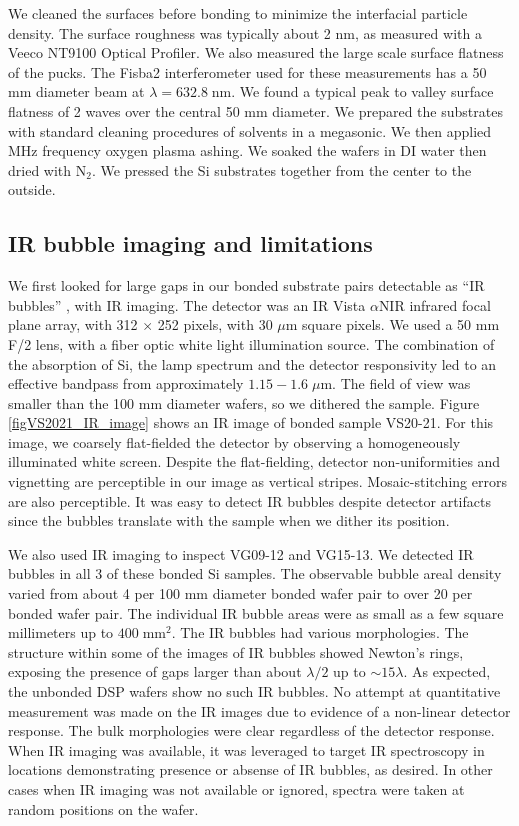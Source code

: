 

We cleaned the surfaces before bonding to minimize the interfacial particle density.  The surface roughness was typically about 2 nm, as measured with a Veeco NT9100 Optical Profiler.  We also measured the large scale surface flatness of the pucks.  The Fisba2 interferometer used for these measurements has a 50 mm diameter beam at $\lambda=632.8\;$nm.  We found a typical peak to valley surface flatness of 2 waves over the central 50 mm diameter.  We prepared the substrates with standard cleaning procedures of solvents in a megasonic.  We then applied MHz frequency oxygen plasma ashing.  We soaked the wafers in DI water then dried with N$_2$.  We pressed the Si substrates together from the center to the outside.

\subsection{IR bubble imaging and limitations}

We first looked for large gaps in our bonded substrate pairs detectable as ``IR bubbles'' \cite{1992JEMat..21..669M}, with IR imaging.  The detector was an IR Vista $\alpha$NIR infrared focal plane array, with 312 $\times$ 252 pixels, with 30 $\mu$m square pixels.  We used a 50 mm F/2 lens, with a fiber optic white light illumination source.  The combination of the absorption of Si, the lamp spectrum and the detector responsivity led to an effective bandpass from approximately $1.15-1.6\;\mu$m.  The field of view was smaller than the 100 mm diameter wafers, so we dithered the sample.  Figure \ref{figVS2021_IR_image} shows an IR image of bonded sample VS20-21.  For this image, we coarsely flat-fielded the detector by observing a homogeneously illuminated white screen. Despite the flat-fielding, detector non-uniformities and vignetting are perceptible in our image as vertical stripes.  Mosaic-stitching errors are also perceptible.  It was easy to detect IR bubbles despite detector artifacts since the bubbles translate with the sample when we dither its position.

We also used IR imaging to inspect VG09-12 and VG15-13.  We detected IR bubbles in all 3 of these bonded Si samples.  The observable bubble areal density varied from about 4 per 100 mm diameter bonded wafer pair to over 20 per bonded wafer pair.  The individual IR bubble areas were as small as a few square millimeters up to $400\;\mathrm{mm}^2$.  The IR bubbles had various morphologies.  The structure within some of the images of IR bubbles showed Newton's rings, exposing the presence of gaps larger than about $\lambda/2$ up to $\sim 15 \lambda$.  As expected, the unbonded DSP wafers show no such IR bubbles.  No attempt at quantitative measurement was made on the IR images due to evidence of a non-linear detector response.  The bulk morphologies were clear regardless of the detector response.  When IR imaging was available, it was leveraged to target IR spectroscopy in locations demonstrating presence or absense of IR bubbles, as desired.  In other cases when IR imaging was not available or ignored, spectra were taken at random positions on the wafer.

